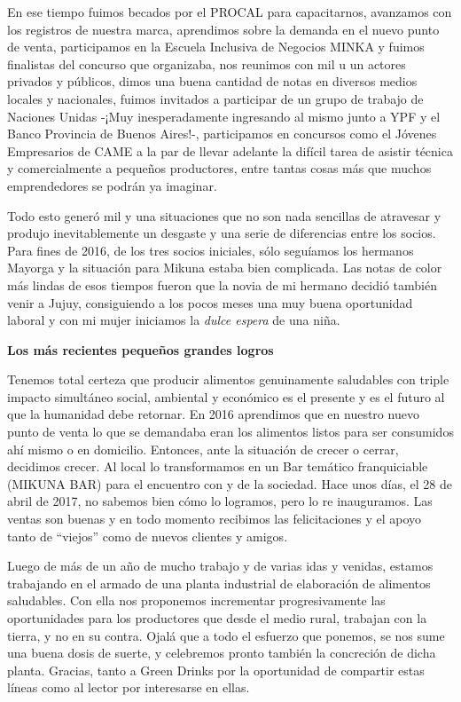 En ese tiempo fuimos becados por el PROCAL para capacitarnos, avanzamos
con los registros de nuestra marca, aprendimos sobre la demanda en el
nuevo punto de venta, participamos en la Escuela Inclusiva de Negocios
MINKA y fuimos finalistas del concurso que organizaba, nos reunimos con
mil u un actores privados y públicos, dimos una buena cantidad de notas
en diversos medios locales y nacionales, fuimos invitados a participar
de un grupo de trabajo de Naciones Unidas -¡Muy inesperadamente
ingresando al mismo junto a YPF y el Banco Provincia de Buenos Aires!-,
participamos en concursos como el Jóvenes Empresarios de CAME a la par
de llevar adelante la difícil tarea de asistir técnica y comercialmente
a pequeños productores, entre tantas cosas más que muchos emprendedores
se podrán ya imaginar.

Todo esto generó mil y una situaciones que no son nada sencillas de
atravesar y produjo inevitablemente un desgaste y una serie de
diferencias entre los socios. Para fines de 2016, de los tres socios
iniciales, sólo seguíamos los hermanos Mayorga y la situación para
Mikuna estaba bien complicada. Las notas de color más lindas de esos
tiempos fueron que la novia de mi hermano decidió también venir a Jujuy,
consiguiendo a los pocos meses una muy buena oportunidad laboral y con
mi mujer iniciamos la \emph{dulce espera} de una niña.

\textbf{Los más recientes pequeños grandes logros}

Tenemos total certeza que producir alimentos genuinamente saludables con
triple impacto simultáneo social, ambiental y económico es el presente y
es el futuro al que la humanidad debe retornar. En 2016 aprendimos que
en nuestro nuevo punto de venta lo que se demandaba eran los alimentos
listos para ser consumidos ahí mismo o en domicilio. Entonces, ante la
situación de crecer o cerrar, decidimos crecer. Al local lo
transformamos en un Bar temático franquiciable (MIKUNA BAR) para el
encuentro con y de la sociedad. Hace unos días, el 28 de abril de 2017,
no sabemos bien cómo lo logramos, pero lo re inauguramos. Las ventas son
buenas y en todo momento recibimos las felicitaciones y el apoyo tanto
de ``viejos'' como de nuevos clientes y amigos.

Luego de más de un año de mucho trabajo y de varias idas y venidas,
estamos trabajando en el armado de una planta industrial de elaboración
de alimentos saludables. Con ella nos proponemos incrementar
progresivamente las oportunidades para los productores que desde el
medio rural, trabajan con la tierra, y no en su contra. Ojalá que a todo
el esfuerzo que ponemos, se nos sume una buena dosis de suerte, y
celebremos pronto también la concreción de dicha planta. Gracias, tanto
a Green Drinks por la oportunidad de compartir estas líneas como al
lector por interesarse en ellas.

